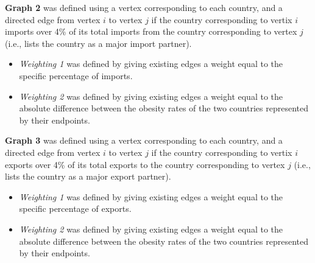 \documentclass[oneside,12pt]{report}
\begin{document}
\textbf{Graph 2} was defined using a vertex corresponding to each country, and a directed edge from vertex $i$ to vertex $j$ if the country corresponding to vertix $i$ imports over 4\% of its total imports from the country corresponding to vertex $j$ (i.e., lists the country as a major import partner).
\begin{itemize}
\item \emph{Weighting 1} was defined by giving existing edges a weight equal to the specific percentage of imports.
\item \emph{Weighting 2} was defined by giving existing edges a weight equal to the absolute difference between the obesity rates of the two countries represented by their endpoints.
\end{itemize}

\textbf{Graph 3} was defined using a vertex corresponding to each country, and a directed edge from vertex $i$ to vertex $j$ if the country corresponding to vertix $i$ exports over 4\% of its total exports to the country corresponding to vertex $j$ (i.e., lists the country as a major export partner).
\begin{itemize}
\item \emph{Weighting 1} was defined by giving existing edges a weight equal to the specific percentage of exports.
\item \emph{Weighting 2} was defined by giving existing edges a weight equal to the absolute difference between the obesity rates of the two countries represented by their endpoints.
\end{itemize}
\end{document}
